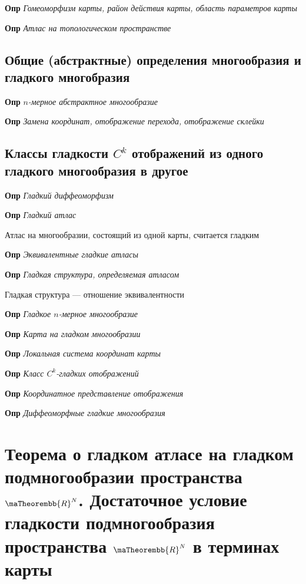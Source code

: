 \documentclass[a4paper, 14pt]{article}
\begin{document}
    \textbf{Опр} \textit{Гомеоморфизм карты, район действия карты, область параметров карты}
    
    \textbf{Опр} \textit{Атлас на топологическом пространстве}
    
    \subsection{Общие (абстрактные) определения многообразия и гладкого многобразия}
    
    \textbf{Опр} \textit{$n$-мерное абстрактное многообразие}
    
    \textbf{Опр} \textit{Замена координат, отображение перехода, отображение склейки}
    
    \subsection{Классы гладкости $C^k$ отображений из одного гладкого многообразия в другое}
    
    \textbf{Опр} \textit{Гладкий диффеоморфизм}
    
    \textbf{Опр} \textit{Гладкий атлас}
    
    Атлас на многообразии, состоящий из одной карты, считается гладким
    
    \textbf{Опр} \textit{Эквивалентные гладкие атласы}
    
    \textbf{Опр} \textit{Гладкая структура, определяемая атласом}
    
    Гладкая структура --- отношение эквивалентности
    
    \textbf{Опр} \textit{Гладкое $n$-мерное многообразие}
    
    \textbf{Опр} \textit{Карта на гладком многообразии}
    
    \textbf{Опр} \textit{Локальная система координат карты}
    
    \textbf{Опр} \textit{Класс $C^k$-гладких отображений}
    
    \textbf{Опр} \textit{Координатное представление отображения}
    
    \textbf{Опр} \textit{Диффеоморфные гладкие многообразия}
    
    \section{Теорема о гладком атласе на гладком подмногообразии пространства $\maTheorembb{R}^N$.
    Достаточное условие гладкости подмногообразия пространства $\maTheorembb{R}^N$ в терминах карты}
    
\end{document}

